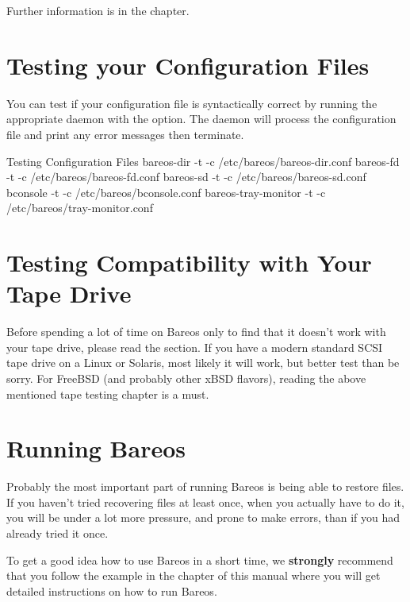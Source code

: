 Further information is in the
 chapter.

\section{Testing your Configuration Files}

You can test if your configuration file is syntactically correct by running
the appropriate daemon with the  option. The daemon will process the
configuration file and print any error messages then terminate.

\begin{commands}{Testing Configuration Files}
bareos-dir -t -c /etc/bareos/bareos-dir.conf
bareos-fd -t -c /etc/bareos/bareos-fd.conf
bareos-sd -t -c /etc/bareos/bareos-sd.conf
bconsole -t -c /etc/bareos/bconsole.conf
bareos-tray-monitor -t -c /etc/bareos/tray-monitor.conf
\end{commands}

\label{TapeTesting}
\section{Testing Compatibility with Your Tape Drive}

Before spending a lot of time on Bareos only to find that it doesn't work
with your tape drive, please read the  section.
If you have a modern
standard SCSI tape drive on a Linux or Solaris, most likely it will work,
but better test than be sorry.  For FreeBSD (and probably other xBSD
flavors), reading the above mentioned tape testing chapter is a must.


\section{Running Bareos}
\label{Running1}

Probably the most important part of running Bareos is being able to restore
files. If you haven't tried recovering files at least once, when you actually
have to do it, you will be under a lot more pressure, and prone to make
errors, than if you had already tried it once.

To get a good idea how to use Bareos in a short time, we {\bf strongly}
recommend that you follow the example in the
 chapter of this manual where
you will get detailed instructions on how to run Bareos.

